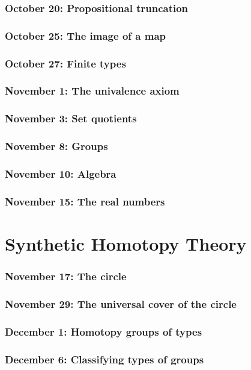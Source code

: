 \documentclass{amsart}
\theoremstyle{theorem}
\theoremstyle{definition}
\theoremstyle{remark}
\newcommand{\0}{\mathbbe{0}}
\newcommand{\1}{\mathbbe{1}}
\newcommand{\2}{\mathbbe{2}}
\newcommand{\3}{\mathbbe{3}}
\newcommand{\4}{\mathbbe{4}}
\begin{document}
\section*{October 20: Propositional truncation}
\section*{October 25: The image of a map}
\section*{October 27: Finite types}
\section*{November 1: The univalence axiom}
\section*{November 3: Set quotients}
\section*{November 8: Groups}
\section*{November 10: Algebra}
\section*{November 15: The real numbers}


\part{Synthetic Homotopy Theory}

\section*{November 17: The circle}
\section*{November 29: The universal cover of the circle}
\section*{December 1: Homotopy groups of types}
\section*{December 6: Classifying types of groups}
\end{document}

